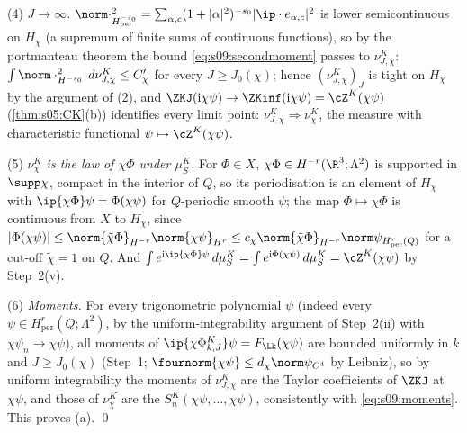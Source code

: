 (4) \emph{$J\to\infty$.} $\norm\cdot^2_{H^{-s_0}_{\mathrm{per}}}=\sum_{\alpha,c}(1+|\alpha|^2)^{-s_0}|\ip\cdot{e_{\alpha,c}}|^2$ is lower semicontinuous on $H_\chi$ (a supremum of finite sums of continuous functions), so by the portmanteau theorem \cite{Bil99} the bound \eqref{eq:s09:secondmoment} passes to $\nu^K_{J,\chi}$: $\int\norm\cdot^2_{H^{-s_0}}\,d\nu^K_{J,\chi}\le C'_\chi$ for every $J\ge J_0(\chi)$; hence $(\nu^K_{J,\chi})_J$ is tight on $H_\chi$ by the argument of (2), and $\ZKJ(\mathrm i\chi\psi)\to\ZKinf(\mathrm i\chi\psi)=\cZ^K(\chi\psi)$ (\cref{thm:s05:CK}(b)) identifies every limit point: $\nu^K_{J,\chi}\Rightarrow\nu^K_\chi$, the measure with characteristic functional $\psi\mapsto\cZ^K(\chi\psi)$.

(5) \emph{$\nu^K_\chi$ is the law of $\chi\Phi$ under $\mu^K_S$.} For $\Phi\in X$, $\chi\Phi\in H^{-r}(\R^3;\Lambda^2)$ is supported in $\supp\chi$, compact in the interior of $Q$, so its periodisation is an element of $H_\chi$ with $\ip{\chi\Phi}\psi=\Phi(\chi\psi)$ for $Q$-periodic smooth $\psi$; the map $\Phi\mapsto\chi\Phi$ is continuous from $X$ to $H_\chi$, since $|\Phi(\chi\psi)|\le\norm{\tilde\chi\Phi}_{H^{-r}}\norm{\chi\psi}_{H^r}\le c_\chi\norm{\tilde\chi\Phi}_{H^{-r}}\norm\psi_{H^r_{\mathrm{per}}(Q)}$ for a cut-off $\tilde\chi=1$ on $Q$. And $\int e^{\mathrm i\ip{\chi\Phi}\psi}\,d\mu^K_S=\int e^{\mathrm i\Phi(\chi\psi)}\,d\mu^K_S=\cZ^K(\chi\psi)$ by Step~2(v).

(6) \emph{Moments.} For every trigonometric polynomial $\psi$ (indeed every $\psi\in H^r_{\mathrm{per}}(Q;\Lambda^2)$, by the uniform-integrability argument of Step~2(ii) with $\chi\psi_n\to\chi\psi$), all moments of $\ip{\chi\Phi^K_{k,J}}\psi=F_{\Lk}(\chi\psi)$ are bounded uniformly in $k$ and $J\ge J_0(\chi)$ (Step~1; $\fournorm{\chi\psi}\le d_\chi\norm\psi_{C^4}$ by Leibniz), so by uniform integrability the moments of $\nu^K_{J,\chi}$ are the Taylor coefficients of $\ZKJ$ at $\chi\psi$, and those of $\nu^K_\chi$ are the $S^K_n(\chi\psi,\dots,\chi\psi)$, consistently with \eqref{eq:s09:moments}. This proves (a). \qed


